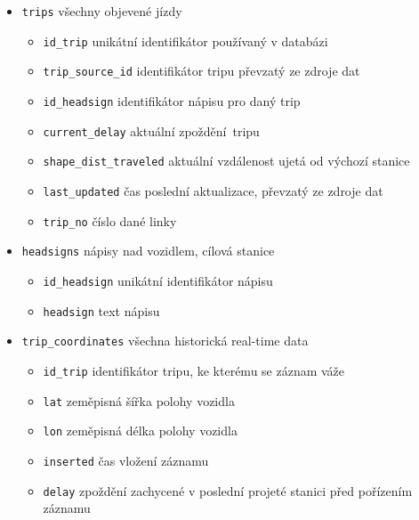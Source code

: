\begin{itemize}
	\item \verb-trips- všechny objevené jízdy

		\begin{itemize}
			\item \verb-id_trip- unikátní identifikátor používaný v databázi

			\item \verb-trip_source_id- identifikátor tripu převzatý ze zdroje dat

			\item \verb-id_headsign- identifikátor nápisu pro daný trip

			\item \verb-current_delay- aktuální zpoždění tripu

			\item \verb-shape_dist_traveled- aktuální vzdálenost ujetá od výchozí stanice

			\item \verb-last_updated- čas poslední aktualizace, převzatý ze zdroje dat

			\item \verb-trip_no- číslo dané linky
		\end{itemize}

	\item \verb-headsigns- nápisy nad vozidlem, cílová stanice

		\begin{itemize}
			\item \verb-id_headsign- unikátní identifikátor nápisu

			\item \verb-headsign- text nápisu
		\end{itemize}

	\item \verb-trip_coordinates- všechna historická real-time data

		\begin{itemize}
			\item \verb-id_trip- identifikátor tripu, ke kterému se záznam váže

			\item \verb-lat- zeměpisná šířka polohy vozidla

			\item \verb-lon- zeměpisná délka polohy vozidla

			\item \verb-inserted- čas vložení záznamu

			\item \verb-delay- zpoždění zachycené v poslední projeté stanici před pořízením záznamu


\end{itemize}
\end{itemize}
